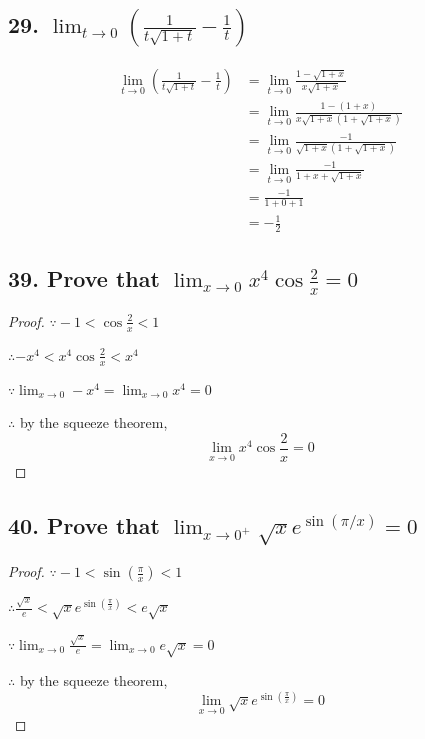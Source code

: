 \documentclass{article}
\begin{document}
    \subsection*{29. $\lim_{t \to 0}(\frac{1}{t\sqrt{1 + t}} - \frac{1}{t})$}
    
    $$
    \begin{aligned}
        \lim_{t \to 0}(\frac{1}{t\sqrt{1 + t}} - \frac{1}{t}) &= \lim_{t \to 0}\frac{1 - \sqrt{1 + x}}{x\sqrt{1+x}} \\
        &= \lim_{t \to 0}\frac{1 - (1 + x)}{x\sqrt{1+x}(1 + \sqrt{1 + x})} \\
        &= \lim_{t \to 0}\frac{-1}{\sqrt{1 + x}(1 + \sqrt{1+x})} \\
        &= \lim_{t \to 0}\frac{-1}{1 + x + \sqrt{1 + x}} \\
        &= \frac{-1}{1 + 0 +1} \\
        &= -\frac 1 2
    \end{aligned}
    $$

    \subsection*{39. Prove that $\lim_{x \to 0}x^4\cos{\frac 2 x} = 0$}

    \begin{proof}
        $\because -1 < \cos \frac{2}{x} < 1$

        $\therefore -x^4 < x^4\cos \frac 2 x < x^4$

        $\because \lim_{x \to 0}-x^4 = \lim_{x \to 0}x^4 = 0$

        $\therefore$ by the squeeze theorem, $$\lim_{x \to 0}x^4\cos \frac 2 x = 0$$
    \end{proof}

    \subsection*{40. Prove that $\lim_{x \to 0^+} \sqrt{x} e^{\sin(\pi/x)} = 0$}

    \begin{proof}
        $\because -1 < \sin(\frac{\pi}{x}) < 1$

        $\therefore \frac{\sqrt x}{e} < \sqrt x e^{\sin(\frac{\pi}{x})} < e\sqrt x$

        $\because \lim_{x \to 0}\frac{\sqrt{x}}{e} = \lim_{x \to 0}e\sqrt{x} = 0$

        $\therefore$ by the squeeze theorem, $$\lim_{x \to 0}\sqrt x e^{\sin(\frac{\pi}{x})} = 0$$
        
    \end{proof}
\end{document}
